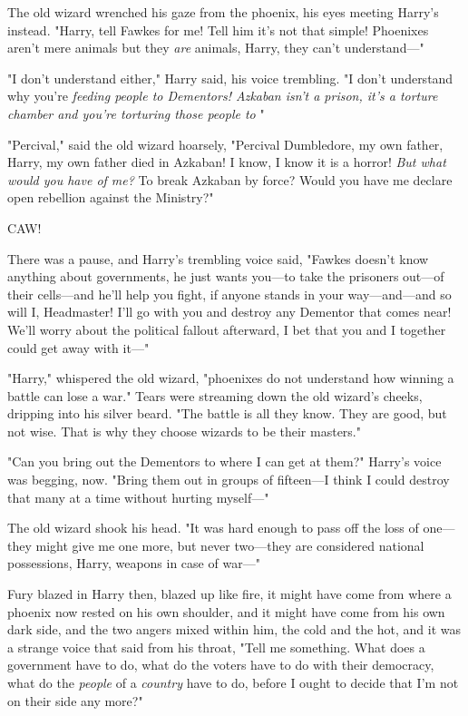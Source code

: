 The old wizard wrenched his gaze from the phoenix, his eyes meeting Harry's
instead. "Harry, tell Fawkes for me! Tell him it's not that simple! Phoenixes
aren't mere animals but they \emph{are} animals, Harry, they can't
understand\mbox{---}"

"I don't understand either," Harry said, his voice trembling. "I don't
understand why you're \emph{feeding people to Dementors! Azkaban isn't a
prison, it's a torture chamber and you're torturing those people to }"

"Percival," said the old wizard hoarsely, "Percival Dumbledore, my own father,
Harry, my own father died in Azkaban! I know, I know it is a horror! \emph{But
what would you have of me?} To break Azkaban by force? Would you have me
declare open rebellion against the Ministry?"

CAW!

There was a pause, and Harry's trembling voice said, "Fawkes doesn't know
anything about governments, he just wants you---to take the prisoners out---of
their cells---and he'll help you fight, if anyone stands in your
way---and---and so will I, Headmaster! I'll go with you and destroy any
Dementor that comes near! We'll worry about the political fallout afterward, I
bet that you and I together could get away with it\mbox{---}"

"Harry," whispered the old wizard, "phoenixes do not understand how winning a
battle can lose a war." Tears were streaming down the old wizard's cheeks,
dripping into his silver beard. "The battle is all they know. They are good,
but not wise. That is why they choose wizards to be their masters."

"Can you bring out the Dementors to where I can get at them?" Harry's voice was
begging, now. "Bring them out in groups of fifteen---I think I could destroy
that many at a time without hurting myself\mbox{---}"

The old wizard shook his head. "It was hard enough to pass off the loss of
one---they might give me one more, but never two---they are considered national
possessions, Harry, weapons in case of war\mbox{---}"

Fury blazed in Harry then, blazed up like fire, it might have come from where a
phoenix now rested on his own shoulder, and it might have come from his own
dark side, and the two angers mixed within him, the cold and the hot, and it
was a strange voice that said from his throat, "Tell me something. What does a
government have to do, what do the voters have to do with their democracy, what
do the \emph{people} of a \emph{country} have to do, before I ought to decide
that I'm not on their side any more?"

